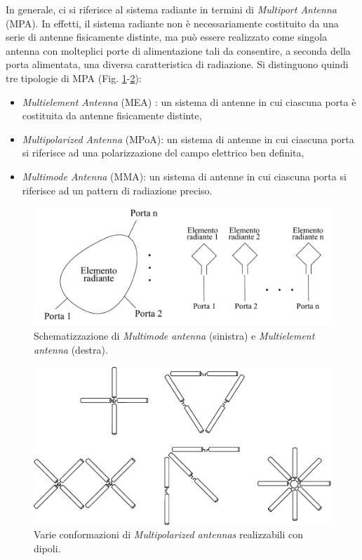 \documentclass[technote]{IEEEtran}
\begin{document}
\par In generale, ci si riferisce al sistema radiante in termini di \textit{Multiport Antenna} (MPA). In effetti, il sistema radiante non è necessariamente costituito da una serie di antenne fisicamente distinte, ma può essere realizzato come singola antenna con molteplici porte di alimentazione tali da consentire, a seconda della porta alimentata, una diversa caratteristica di radiazione. Si distinguono quindi tre tipologie di MPA (Fig. \ref{fig:3}-\ref{fig:4}):
\begin{itemize}
\item \textit{Multielement Antenna} (MEA) : un sistema di antenne in cui ciascuna porta è costituita da antenne fisicamente distinte,
\item \textit{Multipolarized Antenna} (MPoA): un sistema di antenne in cui ciascuna porta si riferisce ad una polarizzazione del campo elettrico ben definita,
\item \textit{Multimode Antenna} (MMA): un sistema di antenne in cui ciascuna porta si riferisce ad un pattern di radiazione preciso.
\end{itemize}
\begin{figure}[!h]
\centering
\includegraphics[width=\columnwidth]{figure3}
\caption{Schematizzazione di \textit{Multimode antenna} (sinistra) e \textit{Multielement antenna} (destra).}
\label{fig:3}
\end{figure}
\begin{figure}[!h]
\centering
\includegraphics[width=0.9\columnwidth]{figure4}
\caption{Varie conformazioni di \textit{Multipolarized antennas} realizzabili con dipoli.}
\label{fig:4}
\end{figure}
\end{document}
